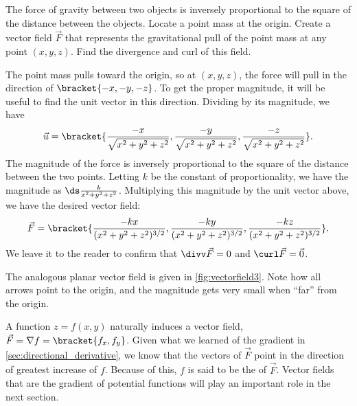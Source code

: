 {The force of gravity between two objects is inversely proportional to the square of the distance between the objects. Locate a point mass at the origin. Create a vector field $\vec F$ that represents the gravitational pull of the point mass at any point $(x,y,z)$. Find the divergence and curl of this field. 
}
{The point mass pulls toward the origin, so at $(x,y,z)$, the force will pull in the direction of $\bracket{-x, -y, -z}$. To get the proper magnitude, it will be useful to find the unit vector in this direction. Dividing by its magnitude, we have
\[
\vec u
= \bracket{\frac{-x}{\sqrt{x^2+y^2+z^2}}, \frac{-y}{\sqrt{x^2+y^2+z^2}},\frac{-z}{\sqrt{x^2+y^2+z^2}}}.
\]
The magnitude of the force is inversely proportional to the square of the distance between the two points. Letting $k$ be the constant of proportionality, we have the magnitude as $\ds\frac{k}{x^2+y^2+z^2}$. Multiplying this magnitude by the unit vector above, we have the desired vector field:
%
%
\[
\vec F
=\bracket{\frac{-kx}{(x^2+y^2+z^2)^{3/2}}, \frac{-ky}{(x^2+y^2+z^2)^{3/2}},\frac{-kz}{(x^2+y^2+z^2)^{3/2}}}.
\]
We leave it to the reader to confirm that $\divv \vec F = 0$ and $\curl \vec F = \vec 0$.

The analogous planar vector field is given in \autoref{fig:vectorfield3}. Note how all arrows point to the origin, and the magnitude gets very small when ``far'' from the origin.}

A function $z=f(x,y)$ naturally induces a vector field, $\vec F = \nabla f =\bracket{f_x,f_y}$. Given what we learned of the gradient in \autoref{sec:directional_derivative}, we know that the vectors of $\vec F$ point in the direction of greatest increase of $f$. Because of this, $f$ is said to be the  of $\vec F$. Vector fields that are the gradient of potential functions will play an important role in the next section.

